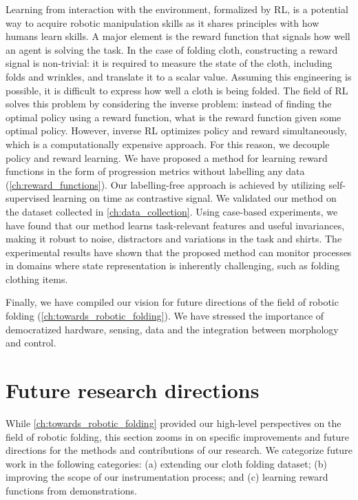 \documentclass[\home/main.tex]{subfiles}
\begin{document}
Learning from interaction with the environment, formalized by RL, is a potential way to acquire robotic manipulation skills as it shares principles with how humans learn skills. A major element is the reward function that signals how well an agent is solving the task. In the case of folding cloth, constructing a reward signal is non-trivial: it is required to measure the state of the cloth, including folds and wrinkles, and translate it to a scalar value. Assuming this engineering is possible, it is difficult to express how well a cloth is being folded. The field of RL solves this problem by considering the inverse problem: instead of finding the optimal policy using a reward function, what is the reward function given some optimal policy. However, inverse RL optimizes policy and reward simultaneously, which is a computationally expensive approach. For this reason, we decouple policy and reward learning. We have proposed a method for learning reward functions in the form of progression metrics without labelling any data (\cref{ch:reward_functions}). Our labelling-free approach is achieved by utilizing self-supervised learning on time as contrastive signal. We validated our method on the dataset collected in \cref{ch:data_collection}. Using case-based experiments, we have found that our method learns task-relevant features and useful invariances, making it robust to noise, distractors and variations in the task and shirts. The experimental results have shown that the proposed method can monitor processes in domains where state representation is inherently challenging, such as folding clothing items.

Finally, we have compiled our vision for future directions of the field of robotic folding (\cref{ch:towards_robotic_folding}). We have stressed the importance of democratized hardware, sensing, data and the integration between morphology and control. 

\section{Future research directions} \label{sec:conc_future_work}
While \cref{ch:towards_robotic_folding} provided our high-level perspectives on the field of robotic folding,
this section zooms in on specific improvements and future directions for the methods and contributions of our research. We categorize future work in the following categories:
(a) extending our cloth folding dataset;
(b) improving the scope of our instrumentation process; and
(c) learning reward functions from demonstrations.
\end{document}
